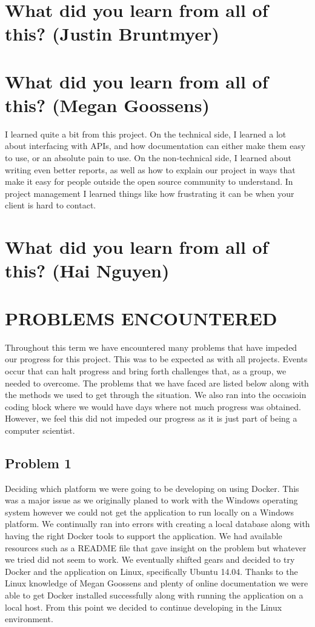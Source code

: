 \documentclass[draftclsnofoot,10pt,onecolumn]{IEEEtran} %
\begin{document}
\section{What did you learn from all of this? (Justin Bruntmyer)}

\section{What did you learn from all of this? (Megan Goossens)}
I learned quite a bit from this project. On the technical side, I learned a lot
about interfacing with APIs, and how documentation can either make them easy to
use, or an absolute pain to use. On the non-technical side, I learned about
writing even better reports, as well as how to explain our project in ways that
make it easy for people outside the open source community to understand.  In
project management I learned things like how frustrating it can be when your
client is hard to contact.

\section{What did you learn from all of this? (Hai Nguyen)}


\section{PROBLEMS ENCOUNTERED}

Throughout this term we have encountered many problems that have impeded our
progress for this project. This was to be expected as with all projects. 
Events
occur that can halt progress and bring forth challenges that, as a group, we
needed to overcome. The problems that we have faced are listed below along with
the methods we used to get through the situation. We also ran into the occasioin coding block where we would have days where not much progress was obtained. However, we feel this did not impeded our progress as
it is just part of being a computer scientist.

\subsection{Problem 1}
Deciding which platform we were going to be developing on using Docker. This was
a major issue as we originally planed to work with the Windows operating system
however we could not get the application to run locally on a Windows platform.
We continually ran into errors with creating a local database along with having
the right Docker tools to support the application. We had available resources
such as a README file that gave insight on the problem but whatever we tried did
not seem to work. We eventually shifted gears and decided to try Docker and the
application on Linux, specifically Ubuntu 14.04. Thanks to the Linux knowledge
of Megan Goossens and plenty of online documentation we were able to get Docker
installed successfully along with running the application on a local host. From
this point we decided to continue developing in the Linux environment.
\end{document}
